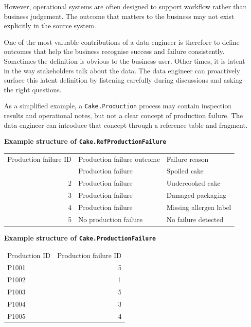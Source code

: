 \documentclass[10pt,openany,10pt]{book}
\newcounter{none}
\let\podeToprule\toprule
\let\podeMidrule\midrule
\let\podeBottomrule\bottomrule
\renewcommand{\toprule}{\arrayrulecolor{pbiGrid}\podeToprule}
\renewcommand{\midrule}{\arrayrulecolor{pbiGrid}\podeMidrule}
\renewcommand{\bottomrule}{\arrayrulecolor{pbiGrid}\podeBottomrule}
\begin{document}
However, operational systems are often designed to support workflow
rather than business judgement. The outcome that matters to the business
may not exist explicitly in the source system.

One of the most valuable contributions of a data engineer is therefore
to define outcomes that help the business recognise success and failure
consistently. Sometimes the definition is obvious to the business user.
Other times, it is latent in the way stakeholders talk about the data.
The data engineer can proactively surface this latent definition by
listening carefully during discussions and asking the right questions.

As a simplified example, a \texttt{Cake.Production} process may contain
inspection results and operational notes, but not a clear concept of
production failure. The data engineer can introduce that concept through
a reference table and fragment.

\textbf{Example structure of \texttt{Cake.RefProductionFailure}}

{\def\LTcaptype{none} %
\begin{longtable}[]{@{}rll@{}}
\toprule\noalign{}
Production failure ID & Production failure outcome & Failure reason \\
\midrule\noalign{}
\endhead
\bottomrule\noalign{}
\endlastfoot
1 & Production failure & Spoiled cake \\
2 & Production failure & Undercooked cake \\
3 & Production failure & Damaged packaging \\
4 & Production failure & Missing allergen label \\
5 & No production failure & No failure detected \\
\end{longtable}
}

\textbf{Example structure of \texttt{Cake.ProductionFailure}}

{\def\LTcaptype{none} %
\begin{longtable}[]{@{}lr@{}}
\toprule\noalign{}
Production ID & Production failure ID \\
\midrule\noalign{}
\endhead
\bottomrule\noalign{}
\endlastfoot
P1001 & 5 \\
P1002 & 1 \\
P1003 & 5 \\
P1004 & 3 \\
P1005 & 4 \\
\end{longtable}
}
\end{document}
